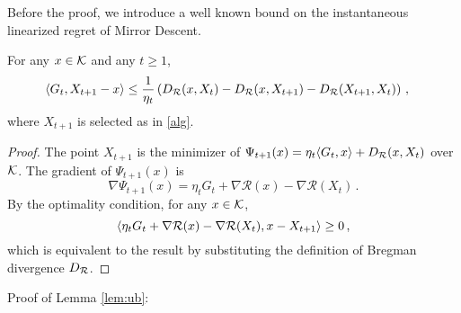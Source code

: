 
Before the proof, we introduce a well known bound on the instantaneous linearized regret of Mirror Descent. 
\begin{lemma}
\label{lem:mdlinregret}
For any $x \in \mathcal{K}$ and any $t \ge 1$,
\begin{align*}
\MoveEqLeft
\ip{G_t, X_{t+1}-x} 
\le \dfrac{1}{\eta_t} \left( \DR(x,X_t)-\DR(x,X_{t+1})-\DR(X_{t+1},X_t) \right)\,,
\end{align*}
where $X_{t+1}$ is selected as in \cref{alg}.
\end{lemma}
\begin{proof}
The point $X_{t+1}$ is the minimizer of 
$\Psi_{t+1}(x)=\eta_t \langle G_t,x \rangle+D_{\mathcal{R}}(x,X_t)$ over $\mathcal{K}$. The gradient of $\Psi_{t+1}(x)$ is
\[
\nabla \Psi_{t+1}(x) = \eta_t G_t + \nabla\mathcal{R}(x)-\nabla\mathcal{R}(X_t)\,.
\]
By the optimality condition, for any $x \in \mathcal{K}$,
\[
\langle \eta_t G_t + \nabla\mathcal{R}(x)-\nabla\mathcal{R}(X_t), x-X_{t+1} \rangle\ge 0 \,,
\]
which is equivalent to the result by substituting the definition of Bregman divergence $D_{\mathcal{R}}$.
\end{proof}

Proof of Lemma \ref{lem:ub}:

